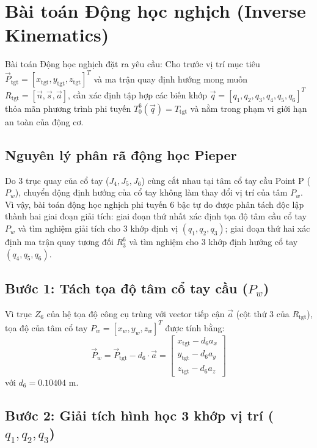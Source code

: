 \section{Bài toán Động học nghịch (Inverse Kinematics)}
\label{sec:inverse_kinematics}

Bài toán Động học nghịch đặt ra yêu cầu: Cho trước vị trí mục tiêu $\vec{P}_{\text{tgt}} = [x_{\text{tgt}}, y_{\text{tgt}}, z_{\text{tgt}}]^T$ và ma trận quay định hướng mong muốn $R_{\text{tgt}} = [\vec{n}, \vec{s}, \vec{a}]$, cần xác định tập hợp các biến khớp $\vec{q} = [q_1, q_2, q_3, q_4, q_5, q_6]^T$ thỏa mãn phương trình phi tuyến $T_0^6(\vec{q}) = T_{\text{tgt}}$ và nằm trong phạm vi giới hạn an toàn của động cơ.

\subsection{Nguyên lý phân rã động học Pieper}

Do 3 trục quay của cổ tay ($J_4, J_5, J_6$) cùng cắt nhau tại tâm cổ tay cầu Point P ($P_w$), chuyển động định hướng của cổ tay không làm thay đổi vị trí của tâm $P_w$. Vì vậy, bài toán động học nghịch phi tuyến 6 bậc tự do được phân tách độc lập thành hai giai đoạn giải tích: giai đoạn thứ nhất xác định tọa độ tâm cầu cổ tay $P_w$ và tìm nghiệm giải tích cho 3 khớp định vị $(q_1, q_2, q_3)$; giai đoạn thứ hai xác định ma trận quay tương đối $R_3^6$ và tìm nghiệm cho 3 khớp định hướng cổ tay $(q_4, q_5, q_6)$.

\subsection{Bước 1: Tách tọa độ tâm cổ tay cầu ($P_w$)}

Vì trục $Z_6$ của hệ tọa độ công cụ trùng với vector tiếp cận $\vec{a}$ (cột thứ 3 của $R_{\text{tgt}}$), tọa độ của tâm cổ tay $P_w = [x_w, y_w, z_w]^T$ được tính bằng:
\begin{equation}
    \vec{P}_w = \vec{P}_{\text{tgt}} - d_6 \cdot \vec{a} = \begin{bmatrix}
        x_{\text{tgt}} - d_6 a_x \\
        y_{\text{tgt}} - d_6 a_y \\
        z_{\text{tgt}} - d_6 a_z
    \end{bmatrix}
    \label{eq:wrist_center}
\end{equation}
với $d_6 = 0.10404\text{ m}$.

\subsection{Bước 2: Giải tích hình học 3 khớp vị trí ($q_1, q_2, q_3$)}

